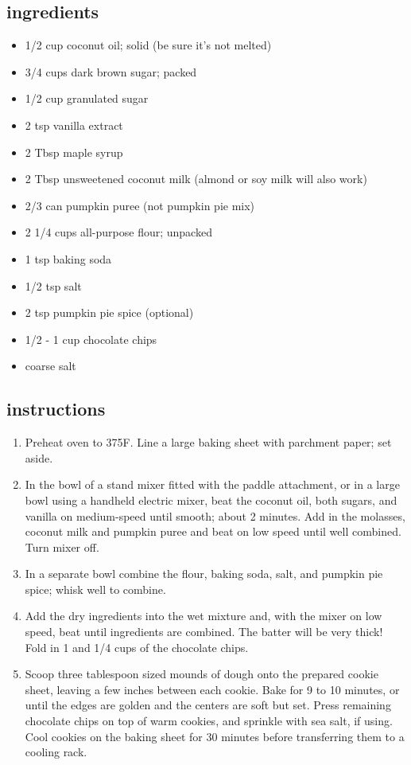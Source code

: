 \documentclass[]{book}
\providecommand{\tightlist}{%
  \setlength{\itemsep}{0pt}\setlength{\parskip}{0pt}}
\begin{document}
\hypertarget{ingredients-21}{%
\subsection{ingredients}\label{ingredients-21}}

\begin{itemize}
\tightlist
\item
  1/2 cup coconut oil; solid (be sure it's not melted)
\item
  3/4 cups dark brown sugar; packed
\item
  1/2 cup granulated sugar
\item
  2 tsp vanilla extract
\item
  2 Tbsp maple syrup
\item
  2 Tbsp unsweetened coconut milk (almond or soy milk will also work)
\item
  2/3 can pumpkin puree (not pumpkin pie mix)
\item
  2 1/4 cups all-purpose flour; unpacked
\item
  1 tsp baking soda
\item
  1/2 tsp salt
\item
  2 tsp pumpkin pie spice (optional)
\item
  1/2 - 1 cup chocolate chips
\item
  coarse salt
\end{itemize}

\hypertarget{instructions-21}{%
\subsection{instructions}\label{instructions-21}}

\begin{enumerate}
\def\labelenumi{\arabic{enumi}.}
\tightlist
\item
  Preheat oven to 375F. Line a large baking sheet with parchment paper; set aside.
\item
  In the bowl of a stand mixer fitted with the paddle attachment, or in a large bowl using a handheld electric mixer,
  beat the coconut oil, both sugars, and vanilla on medium-speed until smooth; about 2 minutes. Add in the molasses,
  coconut milk and pumpkin puree and beat on low speed until well combined. Turn mixer off.
\item
  In a separate bowl combine the flour, baking soda, salt, and pumpkin pie spice; whisk well to combine.
\item
  Add the dry ingredients into the wet mixture and, with the mixer on low speed, beat until ingredients are combined.
  The batter will be very thick! Fold in 1 and 1/4 cups of the chocolate chips.
\item
  Scoop three tablespoon sized mounds of dough onto the prepared cookie sheet, leaving a few inches between each
  cookie. Bake for 9 to 10 minutes, or until the edges are golden and the centers are soft but set. Press remaining
  chocolate chips on top of warm cookies, and sprinkle with sea salt, if using. Cool cookies on the baking sheet for 30
  minutes before transferring them to a cooling rack.
\end{enumerate}
\end{document}
